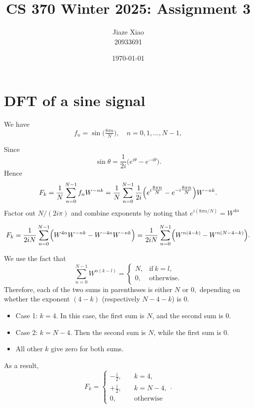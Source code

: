 \documentclass{article}
\title{\textbf{CS 370 Winter 2025: Assignment 3}}
\author{Jiaze Xiao \\ 20933691}
\date{\today}
\begin{document}
\maketitle

\section{DFT of a sine signal}
We have
$$
    f_n =\sin\bigl(\tfrac{8\pi n}{N}\bigr),
    \quad n=0,1,\dots,N-1,
$$

Since
$$
    \sin\theta =\frac{1}{2i}
    \bigl(e^{i\theta} - e^{-i\theta}\bigr).
$$
Hence
$$
    F_k
    =
    \frac{1}{N}\sum_{n=0}^{N-1} f_n W^{-nk}
    =
    \frac{1}{N}\sum_{n=0}^{N-1}
    \frac{1}{2i}\Bigl(
    e^{i\tfrac{8\pi n}{N}}
    -
    e^{-i\tfrac{8\pi n}{N}}
    \Bigr)
    W^{-nk}.
$$
Factor out $N/(2i\pi)$ and combine exponents by noting that
$
    e^{i(8\pi n/N)} = W^{4n}
$

$$
    F_k
    =
    \frac{1}{2iN}\sum_{n=0}^{N-1}
    \Bigl(
    W^{4n}W^{-nk}
    -
    W^{-4n}W^{-nk}
    \Bigr)
    =
    \frac{1}{2iN}\sum_{n=0}^{N-1}
    \Bigl(
    W^{n(4-k)}
    -
    W^{n(N -4 - k)}
    \Bigr).
$$

We use the fact that
$$
    \sum_{n=0}^{N-1} W^{n(k-l)}
    =
    \begin{cases}
        N, & \text{if}\ k=l,   \\
        0, & \text{otherwise}.
    \end{cases}
$$
Therefore, each of the two sums in parentheses is either $N$ or $0,$ depending on whether the exponent $(4-k)$ (respectively $N -4 - k$) is $0.$

\begin{itemize}
    \item Case 1: $k=4$. In this case, the first sum is $N$, and the second sum is $0$.
    \item Case 2: $k=N-4$. Then the second sum is $N$, while the first sum is $0$.
    \item All other $k$ give zero for both sums.
\end{itemize}

As a result,
$$
    \boxed{
        F_k
        =
        \begin{cases}
            \displaystyle
            -\tfrac{i}{2},
            \quad & k = 4,           \\
            \displaystyle
            +\tfrac{i}{2},
            \quad & k = N-4,         \\
            0,    & \text{otherwise}
        \end{cases}
    }.
$$
\end{document}
